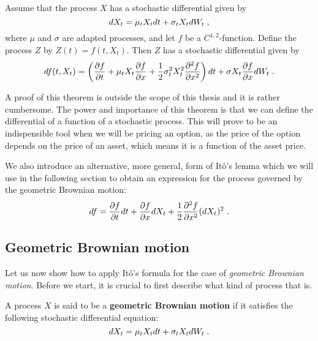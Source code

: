 \documentclass[times, utf8, diplomski]{fer}
\begin{document}
\begin{theorem}[It\^{o}'s Lemma]
Assume that the process $X$ has a stochastic differential given by $$dX_t = \mu_t X_t dt + \sigma_t X_t dW_t\hspace{0.1cm},$$ where $\mu$ and $\sigma$ are adapted processes, and let $f$ be a $C^{1,2}$-function. Define the process $Z$ by $Z(t) = f(t,X_t)$. Then $Z$ has a stochastic differential given by 
$$df(t, X_t) = \left(\frac{\partial f}{\partial t} + \mu_t X_t \frac{\partial f}{\partial x}+\frac{1}{2}\sigma_t^2 X_t^2 \frac{\partial^2f}{\partial x^2}\right)dt + \sigma X_t \frac{\partial f}{\partial x}dW_t\hspace{0.1cm}.$$
\end{theorem}
\noindent A proof of this theorem is outside the scope of this thesis and it is rather cumbersome. The power and importance of this theorem is that we can define the differential of a function of a stochastic process. This will prove to be an indispensible tool when we will be pricing an option, as the price of the option depends on the price of an asset, which means it is a function of the asset price. 

\noindent We also introduce an alternative, more general, form of It\^{o}'s lemma which we will use in the following section to obtain an expression for the process governed by the geometric Brownian motion:
\begin{equation} \label{eqn:ito_general}
	df = \frac{\partial f}{\partial t}dt + \frac{\partial f}{\partial x}dX_t + \frac{1}{2}\frac{\partial^2 f}{\partial x^2}(dX_t)^2 \hspace{0.1cm}.
\end{equation}

\subsection{Geometric Brownian motion} \label{section_gbm}
Let us now show how to apply It\^{o}'s formula for the case of \textit{geometric Brownian motion}. Before we start, it is crucial to first describe what kind of process that is. 

\begin{definition}
A process $X$ is said to be a \textbf{geometric Brownian motion} if it satisfies the following stochastic differential equation:
	\begin{equation}
		dX_t = \mu_t X_t dt + \sigma_t X_t dW_t \hspace{0.1cm}.
	\end{equation}
\end{definition}
\end{document}
